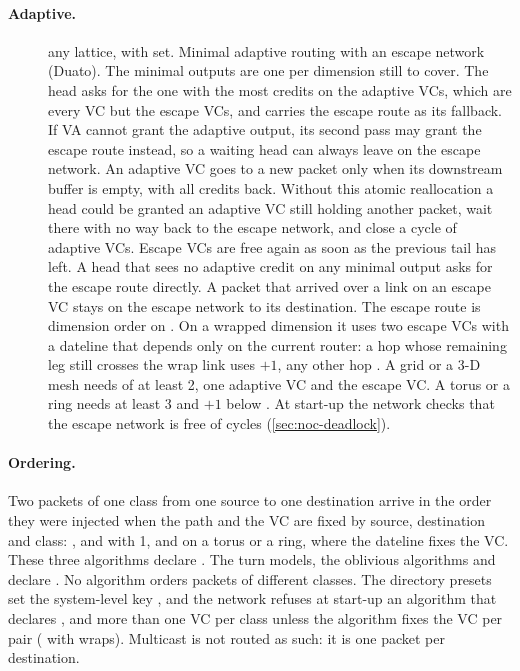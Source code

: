 \paragraph{Adaptive.}
\begin{description}
\item[] any lattice, with  set. Minimal adaptive routing with
  an escape network (Duato). The minimal outputs are one per dimension still to cover. The head
  asks for the one with the most credits on the adaptive VCs, which are every VC but the escape
  VCs, and carries the escape route as its fallback. If VA cannot grant the adaptive output, its
  second pass may grant the escape route instead, so a waiting head can always leave on the escape
  network. An adaptive VC goes to a new packet only when its downstream buffer is empty, with all
  credits back. Without this atomic reallocation a head could be granted an adaptive VC still
  holding another packet, wait there with no way back to the escape network, and close a cycle of
  adaptive VCs. Escape VCs are free again as soon as the previous tail has left. A head that sees
  no adaptive credit on any minimal output asks for the escape route directly. A packet that arrived over a link on an escape VC stays on the escape network to its
  destination. The escape route is dimension order on . On a wrapped dimension it
  uses two escape VCs with a dateline that depends only on the current router: a hop whose
  remaining leg still crosses the wrap link uses $+1$, any other hop
  . A grid or a 3-D mesh needs  of at least 2, one adaptive
  VC and the escape VC. A torus or a ring needs at least 3 and $+1$ below
  . At start-up the network checks that the escape network is free of
  cycles (\cref{sec:noc-deadlock}).
\end{description}

\paragraph{Ordering.} Two packets of one class from one source to one destination arrive in the
order they were injected when the path and the VC are fixed by source, destination and class:
,  and  with  1, and  on a torus or a
ring, where the dateline fixes the VC. These three algorithms declare . The turn models,
the oblivious algorithms and  declare . No algorithm orders
packets of different classes. The directory presets set the system-level key
, and the network refuses at start-up an algorithm that
declares , and more than one VC per class unless the algorithm fixes the VC per pair
( with wraps). Multicast is not routed as such: it is one packet per destination.

